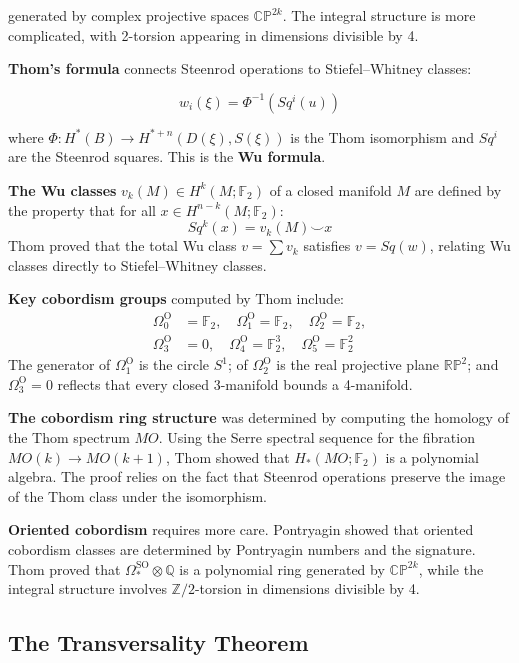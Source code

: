 generated by complex projective spaces $\mathbb{CP}^{2k}$. The integral structure
is more complicated, with 2-torsion appearing in dimensions divisible by 4.

\textbf{Thom's formula} connects Steenrod operations to Stiefel--Whitney classes:

\[w_i(\xi) = \Phi^{-1}(Sq^i(u))\]

where $\Phi: H^*(B) \to H^{*+n}(D(\xi), S(\xi))$ is the Thom isomorphism and
$Sq^i$ are the Steenrod squares. This is the \textbf{Wu formula}.

\textbf{The Wu classes} $v_k(M) \in H^k(M; \mathbb{F}_2)$ of a closed manifold $M$
are defined by the property that for all $x \in H^{n-k}(M; \mathbb{F}_2)$:
\[Sq^k(x) = v_k(M) \smile x\]
Thom proved that the total Wu class $v = \sum v_k$ satisfies $v = Sq(w)$,
relating Wu classes directly to Stiefel--Whitney classes.

\textbf{Key cobordism groups} computed by Thom include:
\begin{align*}
\Omega_0^{\text{O}} &= \mathbb{F}_2, \quad \Omega_1^{\text{O}} = \mathbb{F}_2, \quad \Omega_2^{\text{O}} = \mathbb{F}_2, \\
\Omega_3^{\text{O}} &= 0, \quad \Omega_4^{\text{O}} = \mathbb{F}_2^3, \quad \Omega_5^{\text{O}} = \mathbb{F}_2^2
\end{align*}
The generator of $\Omega_1^{\text{O}}$ is the circle $S^1$; of $\Omega_2^{\text{O}}$
is the real projective plane $\mathbb{RP}^2$; and $\Omega_3^{\text{O}} = 0$ reflects
that every closed 3-manifold bounds a 4-manifold.

\textbf{The cobordism ring structure} was determined by computing the homology of
the Thom spectrum $MO$. Using the Serre spectral sequence for the fibration
$MO(k) \to MO(k+1)$, Thom showed that $H_*(MO; \mathbb{F}_2)$ is a polynomial
algebra. The proof relies on the fact that Steenrod operations preserve the
image of the Thom class under the isomorphism.

\textbf{Oriented cobordism} requires more care. Pontryagin showed that oriented
cobordism classes are determined by Pontryagin numbers and the signature.
Thom proved that $\Omega_*^{\text{SO}} \otimes \mathbb{Q}$ is a polynomial ring
generated by $\mathbb{CP}^{2k}$, while the integral structure involves
$\mathbb{Z}/2$-torsion in dimensions divisible by 4.

\subsection{The Transversality Theorem}

